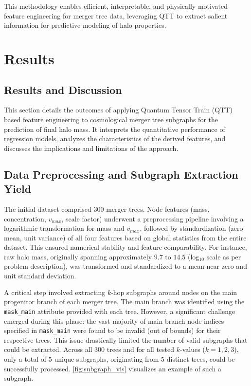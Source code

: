 \documentclass[twocolumn]{aastex631}
\begin{document}
This methodology enables efficient, interpretable, and physically motivated feature engineering for merger tree data, leveraging QTT to extract salient information for predictive modeling of halo properties.

\section{Results}
\label{sec:results}
\subsection{Results and Discussion}

This section details the outcomes of applying Quantum Tensor Train (QTT) based feature engineering to cosmological merger tree subgraphs for the prediction of final halo mass. It interprets the quantitative performance of regression models, analyzes the characteristics of the derived features, and discusses the implications and limitations of the approach.

\subsection{Data Preprocessing and Subgraph Extraction Yield}

The initial dataset comprised 300 merger trees. Node features (mass, concentration, $v_{max}$, scale factor) underwent a preprocessing pipeline involving a logarithmic transformation for mass and $v_{max}$, followed by standardization (zero mean, unit variance) of all four features based on global statistics from the entire dataset. This ensured numerical stability and feature comparability. For instance, raw halo mass, originally spanning approximately $9.7$ to $14.5$ (log$_{10}$ scale as per problem description), was transformed and standardized to a mean near zero and unit standard deviation.

A critical step involved extracting $k$-hop subgraphs around nodes on the main progenitor branch of each merger tree. The main branch was identified using the \texttt{mask\_main} attribute provided with each tree. However, a significant challenge emerged during this phase: the vast majority of main branch node indices specified in \texttt{mask\_main} were found to be invalid (out of bounds) for their respective trees. This issue drastically limited the number of valid subgraphs that could be extracted. Across all 300 trees and for all tested $k$-values ($k=1, 2, 3$), only a total of 5 unique subgraphs, originating from 5 distinct trees, could be successfully processed. \autoref{fig:subgraph_vis} visualizes an example of such a subgraph.
\end{document}
